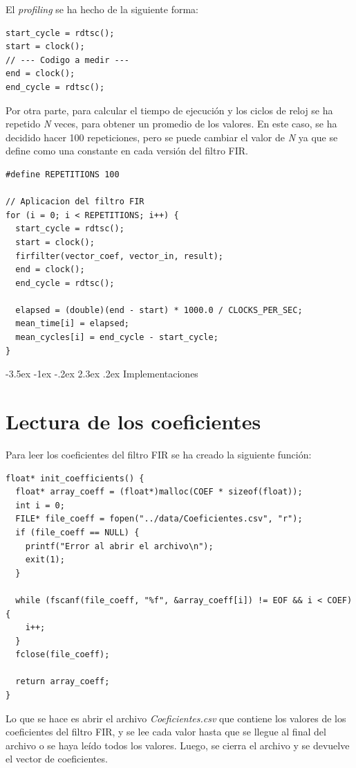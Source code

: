 \documentclass[11pt]{report}
\makeatletter
\renewcommand\chapter{\@startsection{chapter}{0}{\z@}%
    {-3.5ex \@plus -1ex \@minus -.2ex}%
    {2.3ex \@plus.2ex}%
    {\normalfont\Large\bfseries}}
\makeatother
\begin{document}
El \emph{profiling} se ha hecho de la siguiente forma:
\begin{lstlisting}
start_cycle = rdtsc();
start = clock();
// --- Codigo a medir ---
end = clock();
end_cycle = rdtsc();
\end{lstlisting}

Por otra parte, para calcular el tiempo de ejecución y los ciclos de reloj se ha repetido \emph{N} veces, para obtener un promedio de los valores.
En este caso, se ha decidido hacer 100 repeticiones, pero se puede cambiar el valor de \emph{N}
ya que se define como una constante en cada versión del filtro FIR.
\begin{lstlisting}
#define REPETITIONS 100

// Aplicacion del filtro FIR
for (i = 0; i < REPETITIONS; i++) {
  start_cycle = rdtsc();
  start = clock();
  firfilter(vector_coef, vector_in, result);
  end = clock();
  end_cycle = rdtsc();

  elapsed = (double)(end - start) * 1000.0 / CLOCKS_PER_SEC;
  mean_time[i] = elapsed;
  mean_cycles[i] = end_cycle - start_cycle;
}
\end{lstlisting}

\newpage

\chapter{Implementaciones}
\section*{Lectura de los coeficientes}
Para leer los coeficientes del filtro FIR se ha creado la siguiente función:
\begin{lstlisting}
float* init_coefficients() {
  float* array_coeff = (float*)malloc(COEF * sizeof(float));
  int i = 0;
  FILE* file_coeff = fopen("../data/Coeficientes.csv", "r");
  if (file_coeff == NULL) {
    printf("Error al abrir el archivo\n");
    exit(1);
  }

  while (fscanf(file_coeff, "%f", &array_coeff[i]) != EOF && i < COEF) {
    i++;
  }
  fclose(file_coeff);

  return array_coeff;
}
\end{lstlisting}

Lo que se hace es abrir el archivo \emph{Coeficientes.csv} que contiene los valores de los coeficientes del filtro FIR, y se lee cada valor
hasta que se llegue al final del archivo o se haya leído todos los valores. Luego, se cierra el archivo y se devuelve el vector de coeficientes.
\end{document}
